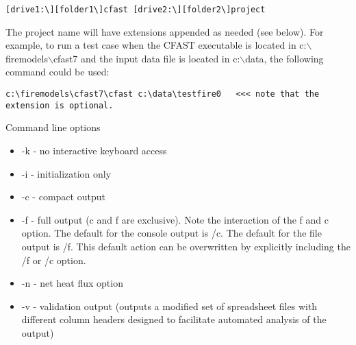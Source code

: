 \begin{lstlisting}
[drive1:\][folder1\]cfast [drive2:\][folder2\]project
\end{lstlisting}

The project name will have extensions appended as needed (see below). For example, to run a test case when the CFAST executable is located in c:$\backslash$firemodels$\backslash$cfast7 and the input data file is located in c:$\backslash$data, the following command could be used:

\begin{lstlisting}
c:\firemodels\cfast7\cfast c:\data\testfire0   <<< note that the extension is optional.
\end{lstlisting}

Command line options

\begin{itemize}
\item -k - no interactive keyboard access
\item -i - initialization only
\item -c - compact output
\item -f - full output (c and f are exclusive). Note the interaction of the f and c option. The default for the console output is /c. The default for the file output is /f. This default action can be overwritten by explicitly including the /f or /c option.
\item -n - net heat flux option
\item -v - validation output (outputs a modified set of spreadsheet files with different column headers designed to facilitate automated analysis of the output)
\end{itemize}


\label{last_page}


